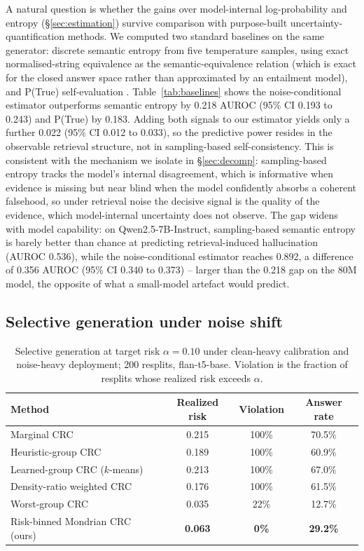 \documentclass[11pt]{article}
\begin{document}
A natural question is whether the gains over model-internal log-probability
and entropy (\S\ref{sec:estimation}) survive comparison with purpose-built
uncertainty-quantification methods. We computed two standard baselines on
the same generator: discrete semantic entropy
\citep{kuhn2023semantic,farquhar2024nature} from five temperature samples,
using exact normalised-string equivalence as the semantic-equivalence
relation (which is exact for the closed answer space rather than approximated
by an entailment model), and P(True) self-evaluation
\citep{kadavath2022language}. Table~\ref{tab:baselines} shows the noise-conditional
estimator outperforms semantic entropy by 0.218 AUROC
(95\% CI 0.193 to 0.243) and P(True) by 0.183. Adding both signals to our
estimator yields only a further 0.022 (95\% CI 0.012 to 0.033), so the
predictive power resides in the observable retrieval structure, not in
sampling-based self-consistency. This is consistent with the
mechanism we isolate in \S\ref{sec:decomp}: sampling-based entropy tracks the
model's internal disagreement, which is informative when evidence is missing
but near blind when the model confidently absorbs a coherent falsehood, so under
retrieval noise the decisive signal is the quality of the evidence, which
model-internal uncertainty does not observe. The gap widens with model capability: on Qwen2.5-7B-Instruct, sampling-based
semantic entropy is barely better than chance at predicting
retrieval-induced hallucination (AUROC 0.536), while the noise-conditional
estimator reaches 0.892, a difference of 0.356 AUROC (95\% CI 0.340 to
0.373) -- larger than the 0.218 gap on the 80M model, the opposite of what a
small-model artefact would predict.

\subsection{Selective generation under noise shift}\label{sec:conformal}

\begin{table}[tbp]
\centering\small
\caption{Selective generation at target risk $\alpha = 0.10$ under
clean-heavy calibration and noise-heavy deployment; 200 resplits,
flan-t5-base. Violation is the fraction of resplits whose realized risk
exceeds $\alpha$.}
\label{tab:crc}
\begin{tabular}{lccc}
\toprule
Method & Realized risk & Violation & Answer rate \\
\midrule
Marginal CRC                    & 0.215 & 100\% & 70.5\% \\
Heuristic-group CRC             & 0.189 & 100\% & 60.9\% \\
Learned-group CRC ($k$-means)   & 0.213 & 100\% & 67.0\% \\
Density-ratio weighted CRC      & 0.176 & 100\% & 61.5\% \\
Worst-group CRC                 & 0.035 & 22\%  & 12.7\% \\
Risk-binned Mondrian CRC (ours) & \textbf{0.063} & \textbf{0\%} & \textbf{29.2\%} \\
\bottomrule
\end{tabular}
\end{table}
\end{document}
